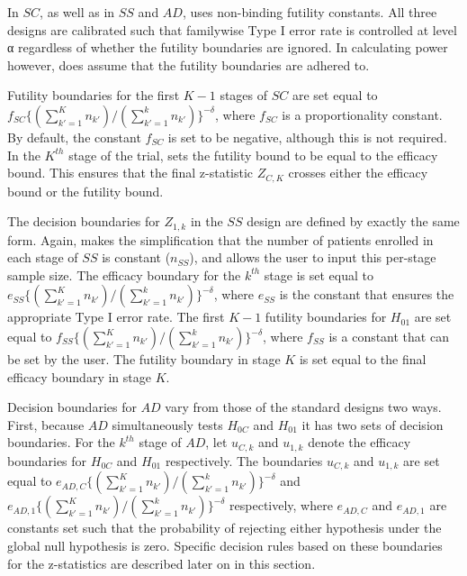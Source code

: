 \documentclass[article]{jss}
\begin{document}
In $SC$, as well as in $SS$ and $AD$,  uses non-binding futility constants. All three designs are calibrated such that familywise Type I error rate is controlled at level α regardless of whether the futility boundaries are ignored. In calculating power however,  does assume that the futility boundaries are adhered to.

Futility boundaries for the first $K-1$ stages of $SC$ are set equal to $f_{SC}\{(\sum_{k'=1}^{K} n_{k'})/(\sum_{k'=1}^{k}n_{k'})\}^{-δ}$, where $f_{SC}$ is a proportionality constant. By default, the constant $f_{SC}$ is set to be negative, although this is not required. In the $K ^{th}$ stage of the trial,  sets the futility bound to be equal to the efficacy bound. This ensures that the final z-statistic $Z_{C,K}$ crosses either the efficacy bound or the futility bound.

The decision boundaries for $Z_{1,k}$ in the $SS$ design are defined by exactly the same form. Again,  makes the simplification that the number of patients enrolled in each stage of $SS$ is constant ($n_{SS}$), and allows the user to input this per-stage sample size. The efficacy boundary for the $k^{th}$ stage is set equal to $e_{SS}\{(\sum_{k'=1}^{K} n_{k'})/(\sum_{k'=1}^{k}n_{k'})\}^{-δ}$, where $e_{SS}$ is the constant that ensures the appropriate Type I error rate. The first $K-1$ futility boundaries for $H_{01}$ are set equal to $f_{SS}\{(\sum_{k'=1}^{K} n_{k'})/(\sum_{k'=1}^{k}n_{k'})\}^{-δ}$,  where $f_{SS}$ is a constant that can be set by the user. The futility boundary in stage $K$ is set equal to the final efficacy boundary in stage $K$.

Decision boundaries for $AD$ vary from those of the standard designs two ways. First, because $AD$ simultaneously tests $H_{0C}$ and $H_{01}$ it has two sets of decision boundaries. For the $k^{th}$ stage of $AD$, let $u_{C,k}$ and $u_{1,k}$ denote the efficacy boundaries for $H_{0C}$ and $H_{01}$ respectively. The boundaries $u_{C,k}$ and $u_{1,k}$ are set equal to $e_{AD,C}\{(\sum_{k'=1}^{K} n_{k'})/(\sum_{k'=1}^{k}n_{k'})\}^{-δ}$ and $e_{AD,1}\{(\sum_{k'=1}^{K} n_{k'})/(\sum_{k'=1}^{k}n_{k'})\}^{-δ}$ respectively, where $e_{AD,C}$  and $e_{AD,1}$ are constants set such that the probability of rejecting either hypothesis under the global null hypothesis is zero. Specific decision rules based on these boundaries for the z-statistics are described later on in this section. 
\end{document}

